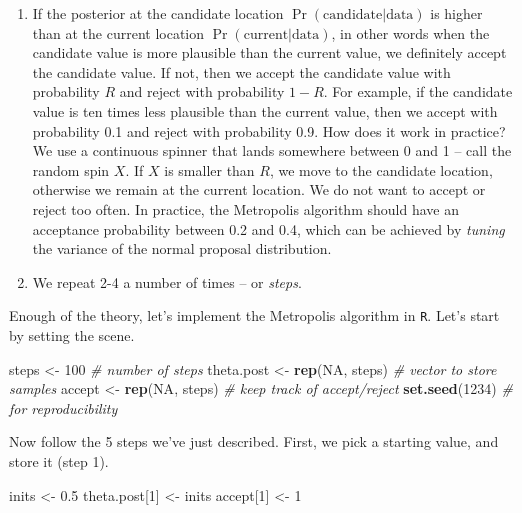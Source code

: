 \documentclass[
  12pt,
]{krantz}
\newenvironment{Shaded}{\begin{snugshade}}{\end{snugshade}}
\newcommand{\CommentTok}[1]{\textcolor[rgb]{0.56,0.35,0.01}{\textit{#1}}}
\newcommand{\ConstantTok}[1]{\textcolor[rgb]{0.56,0.35,0.01}{#1}}
\newcommand{\DecValTok}[1]{\textcolor[rgb]{0.00,0.00,0.81}{#1}}
\newcommand{\FloatTok}[1]{\textcolor[rgb]{0.00,0.00,0.81}{#1}}
\newcommand{\FunctionTok}[1]{\textcolor[rgb]{0.13,0.29,0.53}{\textbf{#1}}}
\newcommand{\NormalTok}[1]{#1}
\newcommand{\OtherTok}[1]{\textcolor[rgb]{0.56,0.35,0.01}{#1}}
\begin{document}
\begin{enumerate}
\def\labelenumi{\arabic{enumi}.}
\setcounter{enumi}{3}
\item
  If the posterior at the candidate location \(\Pr(\text{candidate}|\text{data})\) is higher than at the current location \(\Pr(\text{current}|\text{data})\), in other words when the candidate value is more plausible than the current value, we definitely accept the candidate value. If not, then we accept the candidate value with probability \(R\) and reject with probability \(1-R\). For example, if the candidate value is ten times less plausible than the current value, then we accept with probability 0.1 and reject with probability 0.9. How does it work in practice? We use a continuous spinner that lands somewhere between 0 and 1 -- call the random spin \(X\). If \(X\) is smaller than \(R\), we move to the candidate location, otherwise we remain at the current location. We do not want to accept or reject too often. In practice, the Metropolis algorithm should have an acceptance probability between 0.2 and 0.4, which can be achieved by \emph{tuning} the variance of the normal proposal distribution.
\item
  We repeat 2-4 a number of times -- or \emph{steps}.
\end{enumerate}

Enough of the theory, let's implement the Metropolis algorithm in \texttt{R}. Let's start by setting the scene.

\begin{Shaded}
\begin{Highlighting}[]
\NormalTok{steps }\OtherTok{\textless{}{-}} \DecValTok{100} \CommentTok{\# number of steps}
\NormalTok{theta.post }\OtherTok{\textless{}{-}} \FunctionTok{rep}\NormalTok{(}\ConstantTok{NA}\NormalTok{, steps) }\CommentTok{\# vector to store samples}
\NormalTok{accept }\OtherTok{\textless{}{-}} \FunctionTok{rep}\NormalTok{(}\ConstantTok{NA}\NormalTok{, steps) }\CommentTok{\# keep track of accept/reject}
\FunctionTok{set.seed}\NormalTok{(}\DecValTok{1234}\NormalTok{) }\CommentTok{\# for reproducibility}
\end{Highlighting}
\end{Shaded}

Now follow the 5 steps we've just described. First, we pick a starting value, and store it (step 1).

\begin{Shaded}
\begin{Highlighting}[]
\NormalTok{inits }\OtherTok{\textless{}{-}} \FloatTok{0.5}
\NormalTok{theta.post[}\DecValTok{1}\NormalTok{] }\OtherTok{\textless{}{-}}\NormalTok{ inits}
\NormalTok{accept[}\DecValTok{1}\NormalTok{] }\OtherTok{\textless{}{-}} \DecValTok{1}
\end{Highlighting}
\end{Shaded}
\end{document}
